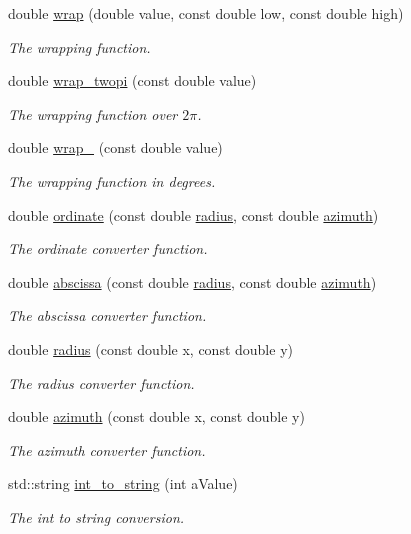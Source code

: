 \begin{DoxyCompactItemize}
double \hyperlink{namespace_hoa_a313552058c836fb832ead703eb1c8ca1}{wrap} (double value, const double low, const double high)
\begin{DoxyCompactList}\small\item\em The wrapping function. \end{DoxyCompactList}\item 
double \hyperlink{namespace_hoa_a951a6800c87c7cb7428ccb05ed778e84}{wrap\-\_\-twopi} (const double value)
\begin{DoxyCompactList}\small\item\em The wrapping function over $2\pi$. \end{DoxyCompactList}\item 
double \hyperlink{namespace_hoa_a479e2d2c9b1797486c6e93fe82334392}{wrap\-\_} (const double value)
\begin{DoxyCompactList}\small\item\em The wrapping function in degrees. \end{DoxyCompactList}\item 
double \hyperlink{namespace_hoa_a2f9336c48f973edc26ba376443f5184b}{ordinate} (const double \hyperlink{namespace_hoa_ac6d88761b7f0648bf17ecc606e7db797}{radius}, const double \hyperlink{namespace_hoa_a29fdd6f7a1826039c063ce42221fcd0d}{azimuth})
\begin{DoxyCompactList}\small\item\em The ordinate converter function. \end{DoxyCompactList}\item 
double \hyperlink{namespace_hoa_ac05a6ef1c0f14abead46a331b2f81ad8}{abscissa} (const double \hyperlink{namespace_hoa_ac6d88761b7f0648bf17ecc606e7db797}{radius}, const double \hyperlink{namespace_hoa_a29fdd6f7a1826039c063ce42221fcd0d}{azimuth})
\begin{DoxyCompactList}\small\item\em The abscissa converter function. \end{DoxyCompactList}\item 
double \hyperlink{namespace_hoa_ac6d88761b7f0648bf17ecc606e7db797}{radius} (const double x, const double y)
\begin{DoxyCompactList}\small\item\em The radius converter function. \end{DoxyCompactList}\item 
double \hyperlink{namespace_hoa_a29fdd6f7a1826039c063ce42221fcd0d}{azimuth} (const double x, const double y)
\begin{DoxyCompactList}\small\item\em The azimuth converter function. \end{DoxyCompactList}\item 
std\-::string \hyperlink{namespace_hoa_a383e28307f0bbd7c0e4af194ebabe66f}{int\-\_\-to\-\_\-string} (int a\-Value)
\begin{DoxyCompactList}\small\item\em The int to string conversion. \end{DoxyCompactList}\end{DoxyCompactItemize}


